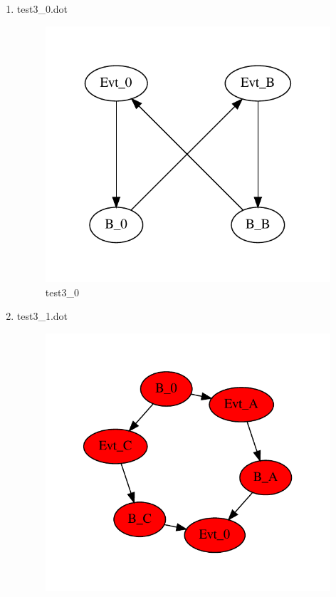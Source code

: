 \documentclass[12pt,a4paper]{report}
\begin{document}
\begin{enumerate}
\begin{figure}
        \label{fig:test2}
    \end{figure}
\item test3\_0.dot
    \begin{figure}
        \centering 
        \includegraphics*[width=1.0\textwidth,keepaspectratio]{TestPattern/test3_0.pdf}
        \caption{test3\_0}
        \label{fig:test3_0}
    \end{figure}
\item test3\_1.dot
    \begin{figure}
        \centering 
        \includegraphics*[width=1.0\textwidth,keepaspectratio]{TestPattern/test3_1.pdf}

\end{figure}
\end{enumerate}
\end{document}
